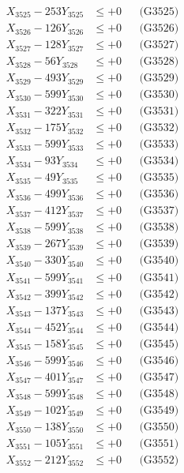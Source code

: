 \documentclass[a4paper,10pt]{article}
\begin{document}
{\begin{align}
X_{3525} - 253Y_{3525} &\leq +0 && \text{(G3525)} \\
X_{3526} - 126Y_{3526} &\leq +0 && \text{(G3526)} \\
X_{3527} - 128Y_{3527} &\leq +0 && \text{(G3527)} \\
X_{3528} - 56Y_{3528} &\leq +0 && \text{(G3528)} \\
X_{3529} - 493Y_{3529} &\leq +0 && \text{(G3529)} \\
X_{3530} - 599Y_{3530} &\leq +0 && \text{(G3530)} \\
\allowbreak
X_{3531} - 322Y_{3531} &\leq +0 && \text{(G3531)} \\
X_{3532} - 175Y_{3532} &\leq +0 && \text{(G3532)} \\
X_{3533} - 599Y_{3533} &\leq +0 && \text{(G3533)} \\
X_{3534} - 93Y_{3534} &\leq +0 && \text{(G3534)} \\
X_{3535} - 49Y_{3535} &\leq +0 && \text{(G3535)} \\
X_{3536} - 499Y_{3536} &\leq +0 && \text{(G3536)} \\
X_{3537} - 412Y_{3537} &\leq +0 && \text{(G3537)} \\
X_{3538} - 599Y_{3538} &\leq +0 && \text{(G3538)} \\
X_{3539} - 267Y_{3539} &\leq +0 && \text{(G3539)} \\
X_{3540} - 330Y_{3540} &\leq +0 && \text{(G3540)} \\
\allowbreak
X_{3541} - 599Y_{3541} &\leq +0 && \text{(G3541)} \\
X_{3542} - 399Y_{3542} &\leq +0 && \text{(G3542)} \\
X_{3543} - 137Y_{3543} &\leq +0 && \text{(G3543)} \\
X_{3544} - 452Y_{3544} &\leq +0 && \text{(G3544)} \\
X_{3545} - 158Y_{3545} &\leq +0 && \text{(G3545)} \\
X_{3546} - 599Y_{3546} &\leq +0 && \text{(G3546)} \\
X_{3547} - 401Y_{3547} &\leq +0 && \text{(G3547)} \\
X_{3548} - 599Y_{3548} &\leq +0 && \text{(G3548)} \\
X_{3549} - 102Y_{3549} &\leq +0 && \text{(G3549)} \\
X_{3550} - 138Y_{3550} &\leq +0 && \text{(G3550)} \\
\allowbreak
X_{3551} - 105Y_{3551} &\leq +0 && \text{(G3551)} \\
X_{3552} - 212Y_{3552} &\leq +0 && \text{(G3552)} \\

\end{align}}
\end{document}
